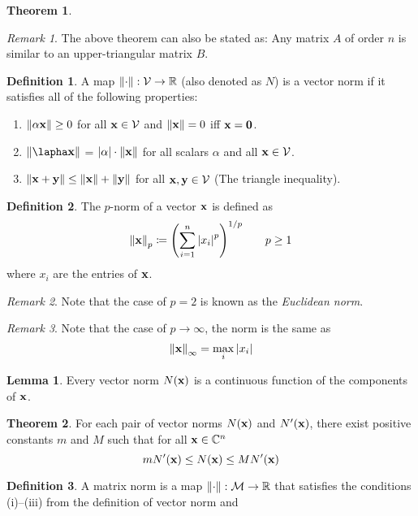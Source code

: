 \documentclass[11pt,letterpaper]{article}
\numberwithin{figure}{section} %
\newcommand{\Reals}{\mathbb{R}}
\newcommand{\Complex}{\mathbb{C}}
\newcommand{\keyword}[1]{\colorbox{cyan!20!}{#1}}
\theoremstyle{definition}
\newtheorem{theorem}{Theorem}[subsection]
\theoremstyle{definition}
\newtheorem{lemma}{Lemma}[subsection]
\theoremstyle{definition}
\newtheorem{definition}{Definition}[subsection]
\theoremstyle{definition}
\theoremstyle{remark}
\newtheorem*{remark}{Remark}
\theoremstyle{remark}
\theoremstyle{definition}
\theoremstyle{remark}
\theoremstyle{remark}
\begin{document}
\begin{multicols*}{3}
\begin{theorem}
\end{theorem}
\begin{remark}
	The above theorem can also be stated as: Any matrix $A$ of order $n$ is
	similar to an upper-triangular matrix $B$.
\end{remark}
\begin{definition}
	A map $\norm{\cdot} : \mathcal{V} \to \Reals$ (also denoted as $N$) is a
	\keyword{vector norm} if it satisfies all of the following properties:
	\begin{enumerate}[label={(\roman*)}]
		\item $\norm{\alpha\vb{x}} \geq 0$ for all $\vb{x} \in \mathcal{V}$ and
			$\norm{\vb{x}} = 0$ iff $\vb{x} = \vb{0}$.
		\item $\norm{\lapha \vb{x}}$ = $\abs{\alpha}\cdot \norm{\vb{x}}$ for all 
			scalars $\alpha$ and all $\vb{x} \in \mathcal{V}$.
		\item $\norm{\vb{x} + \vb{y}} \leq \norm{\vb{x}} + \norm{\vb{y}}$ for all
			$\vb{x},\vb{y} \in \mathcal{V}$ (The triangle inequality).
	\end{enumerate}
\end{definition}
\begin{definition}
	The \keyword{$p$-norm} of a vector $\vb{x}$ is defined as 
	\[
		\norm{\vb{x}}_p \coloneqq \pqty{\sum_{i=1}^n \abs{x_i}^p}^{1/p} \qquad p \geq 1
	\]
	where $x_i$ are the entries of $\vb{x}$.
\end{definition}
\begin{remark}
	Note that the case of $p=2$ is known as the \textit{Euclidean norm}.
\end{remark}
\begin{remark}
	Note that the case of $p\to\infty$, the norm is the same as
	\[
		\norm{\vb{x}}_\infty = \max_i \abs{x_i}
	\]
\end{remark}
\begin{lemma}\label{lem:norm_cont_func}
	Every vector norm $N(\vb{x})$ is a continuous function of the components of
	$\vb{x}$.
\end{lemma}
\begin{theorem}\label{thm:norm_eqiv}
	For each pair of vector norms $N(\vb{x})$ and $N'(\vb{x})$, there exist
	positive constants $m$ and $M$ such that for all $\vb{x} \in \Complex^n$
	\[
		mN'(\vb{x}) \leq N(\vb{x}) \leq MN'(\vb{x})
	\]
\end{theorem}
\begin{definition}
	A \keyword{matrix norm} is a map $\norm{\cdot} : \mathcal{M} \to \Reals$ that
	satisfies the conditions (i)--(iii) from the definition of vector norm and

\end{definition}
\end{multicols*}
\end{document}
